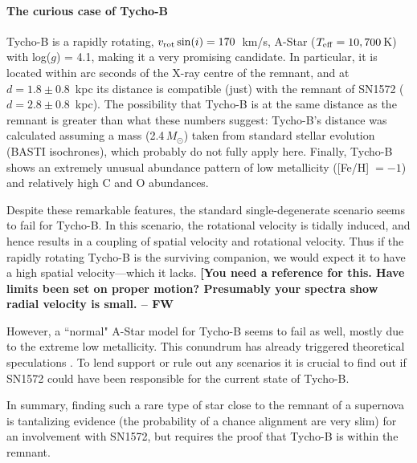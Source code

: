 \documentclass[12pt]{article}
\begin{document}
\vspace{-5mm}
\paragraph{The curious case of Tycho-B}
Tycho-B is a rapidly rotating, $v_{{\rm rot}}\, {\rm sin}(i)=170$~km/s, A-Star ($T_{\rm eff}=10,700$\,K) with  log($g$) = 4.1, making it a very promising candidate. In particular,  it is located within arc seconds of the X-ray centre of the remnant, and at $d = 1.8\pm 0.8$~kpc its distance is compatible (just) with the remnant of SN1572 ($d = 2.8\pm0.8$~kpc). The possibility that Tycho-B is at the same distance as the remnant is greater than what these numbers suggest: Tycho-B's distance was calculated assuming a mass (2.4\,$M_\odot$) taken from standard stellar evolution (BASTI isochrones), which probably do not fully apply here. Finally, Tycho-B shows an extremely unusual abundance pattern of low metallicity ([Fe/H]$\; =-1$) and relatively high C and O abundances.

Despite these remarkable features, the standard single-degenerate scenario seems to fail \citep{2012arXiv1210.2713K} for Tycho-B.  In this scenario, the rotational velocity is tidally induced, and hence  results in a coupling of spatial velocity and rotational velocity.  Thus if the rapidly rotating Tycho-B is the surviving companion, we would  expect it to have a high spatial velocity---which it lacks.  {\bf[You need a reference for this.  Have limits been set on proper motion?  Presumably your spectra show radial velocity is small. -- FW}

However, a ``normal" A-Star model for Tycho-B seems to fail as well, mostly due to the extreme low metallicity. This conundrum has already triggered theoretical speculations \citep[e.g.][]{2012arXiv1212.2662T}. To lend support or rule out any scenarios it is crucial to find out if SN1572 could have been responsible for the current state of Tycho-B.

In summary, finding such a rare type of star close to the remnant of a supernova is tantalizing evidence (the probability of a chance alignment are very slim) for an involvement with SN1572, but requires the proof that Tycho-B is within the remnant.

\vspace{-5mm}
\end{document}
